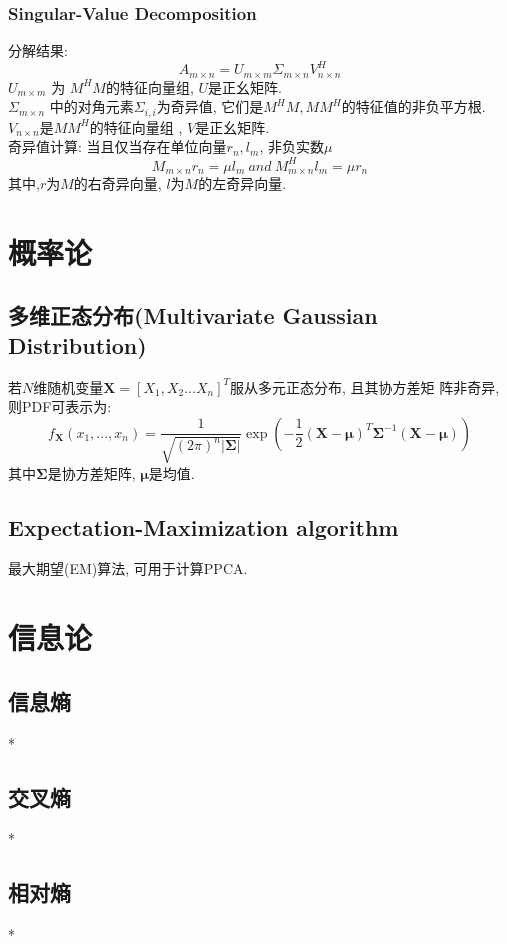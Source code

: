 \documentclass[oneside]{book}
\begin{document}
				\subsubsection{Singular-Value Decomposition}
					分解结果:
					$$A_{m\times n}=U_{m\times m}\Sigma_{m\times n} V^H_{n\times n}$$
					$U_{m\times m}$ 为 $M^HM$的特征向量组, $U$是正幺矩阵.\\
					$\Sigma_{m\times n}$ 中的对角元素$\Sigma_{i,i}$为奇异值, 它们是$M^HM, MM^H$的特征值的非负平方根.\\
					$V_{n\times n}$是$MM^H$的特征向量组 , $V$是正幺矩阵.\\
					奇异值计算:
					当且仅当存在单位向量$r_n, l_m$, 非负实数$\mu$
					$$M_{m\times n}r_{n} = \mu l_{m}~and~M^H_{m\times n} l_{m} = \mu r_{n}$$
					其中,$r$为$M$的右奇异向量, $l$为$M$的左奇异向量.
	
		\section{概率论}
			\subsection{多维正态分布(Multivariate Gaussian Distribution)}	
				若$N$维随机变量$\boldsymbol{X}= [X_{1}, X_{2} ... X_{n}]^{T}$服从多元正态分布, 且其协方差矩
				阵非奇异, 则PDF可表示为:				
				$$f_{\boldsymbol{X}}(x_{1}, ... , x_{n}) = \frac{1}{\sqrt{(2\pi)^{n}|\boldsymbol{\Sigma}|}}\exp{\left(-\frac{1}{2}(\boldsymbol{X}-\boldsymbol{\mu})^{T}\boldsymbol{\Sigma}^{-1}(\boldsymbol{X}-\boldsymbol{\mu})\right)}$$
				其中$\boldsymbol{\Sigma}$是协方差矩阵, $\boldsymbol{\mu}$是均值.
				\subsection{Expectation-Maximization algorithm}
				最大期望(EM)算法, 可用于计算PPCA.
		\section{信息论}
			\subsection{信息熵}
			*
			\subsection{交叉熵}
			*
			\subsection{相对熵}
			*
	\setcounter{chapter}{0}
	\renewcommand{\thechapter}{\arabic{chapter}}
\end{document}
